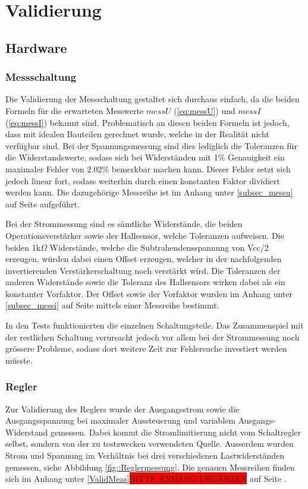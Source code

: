 \section{Validierung}

\subsection{Hardware}

\subsubsection{Messschaltung}
Die Validierung der Messschaltung gestaltet sich durchaus einfach, da die beiden Formeln für die erwarteten Messwerte $messU$ (\ref{eq:messU}) und $messI$ (\ref{eq:messI}) bekannt sind. Problematisch an diesen beiden Formeln ist jedoch, dass mit idealen Bauteilen gerechnet wurde, welche in der Realität nicht verfügbar sind. Bei der Spannungsmessung sind dies lediglich die Toleranzen für die Widerstandswerte, sodass sich bei Widerständen mit 1\% Genauigkeit ein maximaler Fehler von 2.02\% bemerkbar machen kann. Dieser Fehler setzt sich jedoch linear fort, sodass weiterhin durch einen konstanten Faktor dividiert werden kann. Die dazugehörige Messreihe ist im Anhang unter \ref{subsec_messu} auf Seite \pageref{subsec_messu} aufgeführt.

Bei der Strommessung sind es sämtliche Widerstände, die beiden Operationsverstärker sowie der Hallsensor, welche Toleranzen aufweisen. Die beiden 1k$\Omega$ Widerstände, welche die Subtrahendensspannung von Vcc/2 erzeugen, würden dabei einen Offset erzeugen, welcher in der nachfolgenden invertierenden Verstärkerschaltung noch verstärkt wird. Die Toleranzen der anderen Widerstände sowie die Toleranz des Hallsensors wirken dabei als ein konstanter Vorfaktor. Der Offset sowie der Vorfaktor wurden im Anhang unter \ref{subsec_messi} auf Seite \pageref{subsec_messi} mittels einer Messreihe bestimmt.

In den Tests funktionierten die einzelnen Schaltungsteile. Das Zusammenspiel mit der restlichen Schaltung verursacht jedoch vor allem bei der Strommessung noch grössere Probleme, sodass dort weitere Zeit zur Fehlersuche investiert werden müsste.

\subsubsection{Regler}\label{subsec:ValRegler}

Zur Validierung des Reglers wurde der Ausgangsstrom sowie die Ausgangsspannung bei maximaler Aussteuerung und variablem Ausgangs-Widerstand gemessen. Dabei kommt die Stromlimitierung nicht vom Schaltregler selbst, sondern von der zu testzwecken verwendeten Quelle. Ausserdem wurden Strom und Spannung im Verhältnis bei drei verschiedenen Lastwiderständen gemessen, siehe Abbildung \ref{fig::Reglermessung}. Die genauen Messreihen finden sich im Anhang unter \ref{ValidMeas}\colorbox{red}{BITTE ANHANG ERGÄNZEN} auf Seite \pageref{ValidMeas}.

